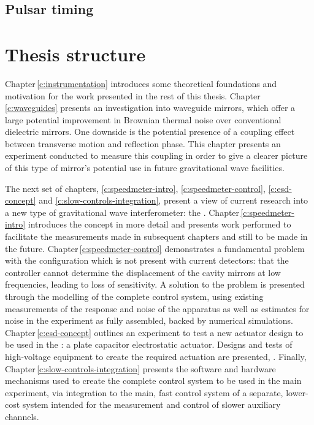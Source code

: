 \subsection{Pulsar timing}

\section{Thesis structure}
Chapter\,\ref{c:instrumentation} introduces some theoretical foundations and motivation for the work presented in the rest of this thesis. Chapter\,\ref{c:waveguides} presents an investigation into waveguide mirrors, which offer a large potential improvement in Brownian thermal noise over conventional dielectric mirrors. One downside is the potential presence of a coupling effect between transverse motion and reflection phase. This chapter presents an experiment conducted to measure this coupling in order to give a clearer picture of this type of mirror's potential use in future gravitational wave facilities.

The next set of chapters, \ref{c:speedmeter-intro}, \ref{c:speedmeter-control}, \ref{c:esd-concept} and \ref{c:slow-controls-integration}, present a view of current research into a new type of gravitational wave interferometer: the \SSM{}. Chapter\,\ref{c:speedmeter-intro} introduces the concept in more detail and presents work performed to facilitate the measurements made in subsequent chapters and still to be made in the future. Chapter\,\ref{c:speedmeter-control} demonstrates a fundamental problem with the \SSM{} configuration which is not present with current detectors: that the controller cannot determine the displacement of the cavity mirrors at low frequencies, leading to loss of sensitivity. A solution to the problem is presented through the modelling of the complete control system, using existing measurements of the response and noise of the apparatus as well as estimates for noise in the experiment as fully assembled, backed by numerical simulations. Chapter\,\ref{c:esd-concept} outlines an experiment to test a new actuator design to be used in the \SSMEXPT{}: a plate capacitor electrostatic actuator. Designs and tests of high-voltage equipment to create the required actuation are presented, . Finally, Chapter\,\ref{c:slow-controls-integration} presents the software and hardware mechanisms used to create the complete control system to be used in the main experiment, via integration to the main, fast control system of a separate, lower-cost system intended for the measurement and control of slower auxiliary channels.

